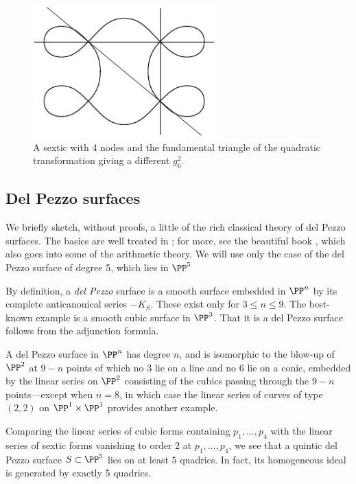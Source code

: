  
\begin{figure}
\centerline {\includegraphics[height=2in]{"main/Fig11-4"}}
\caption{A sextic with 4 nodes and the fundamental triangle of the quadratic transformation giving
a different $g^{2}_{6}$.}
\label{default}
\end{figure}


\subsection{Del Pezzo surfaces}

We briefly sketch, without proofs, a little of the 
 rich classical theory of del Pezzo surfaces. The basics are well treated in \cite[pp. 45--50]{Beauville}; for more, see the
beautiful book \cite{Manin}, which also goes into some of the arithmetic theory. We will use only the case of the del Pezzo surface of degree 5, which lies in $\PP^{5}$

By definition,
a \emph{del Pezzo} surface is a smooth surface embedded in $\PP^n$  by its complete anticanonical series $-K_S$. These exist only for $3\leq n\leq 9$. The best-known example is a smooth cubic surface in $\PP^3$. That it is a del Pezzo surface follows from the adjunction formula.

A del Pezzo surface in $\PP^n$ has degree $n$, and is isomorphic to the blow-up of $\PP^2$ at $9-n$ points of which no 3 lie on a line and no 6 lie on a conic, embedded by the linear series on $\PP^2$
consisting of the cubics passing through the $9-n$ points---except when $n=8$, in which case the
linear series of curves of type $(2,2)$ on $\PP^1\times \PP^1$ provides another example.

Comparing the linear series  of cubic forms containing $p_1,\dots,p_4$ with the linear series  of sextic forms vanishing to order 2 at $p_1,\dots,p_4$, we see that a quintic del Pezzo surface $S \subset \PP^5$ lies on at least $5$ quadrics. In fact, its homogeneous ideal is generated by exactly 5 quadrics.


